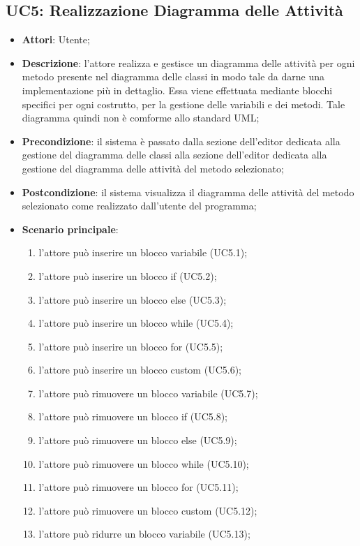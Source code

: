 \subsection{UC5: Realizzazione Diagramma delle Attività}
\label{UC5}
\begin{itemize}
	\item \textbf{Attori}: Utente;
	\item \textbf{Descrizione}: l'attore realizza e gestisce un diagramma delle attività per ogni metodo presente nel diagramma delle classi in modo tale da darne una implementazione più in dettaglio. Essa viene effettuata mediante blocchi specifici per ogni costrutto, per la gestione delle variabili e dei metodi. Tale diagramma quindi non è comforme allo standard UML;
	\item \textbf{Precondizione}: il sistema è passato dalla sezione dell'editor dedicata alla gestione del diagramma delle classi alla sezione dell'editor dedicata alla gestione del diagramma delle attività del metodo selezionato;
	\item \textbf{Postcondizione}: il sistema visualizza il diagramma delle attività del metodo selezionato come realizzato dall'utente del programma;
	\item \textbf{Scenario principale}:
	\begin{enumerate}
		\item l'attore può inserire un blocco variabile (UC5.1);
		\item l'attore può inserire un blocco if (UC5.2);
		\item l'attore può inserire un blocco else (UC5.3);
		\item l'attore può inserire un blocco while (UC5.4);
		\item l'attore può inserire un blocco for (UC5.5);
		\item l'attore può inserire un blocco custom (UC5.6);
		\item l'attore può rimuovere un blocco variabile (UC5.7);
		\item l'attore può rimuovere un blocco if (UC5.8);
		\item l'attore può rimuovere un blocco else (UC5.9);
		\item l'attore può rimuovere un blocco while (UC5.10);
		\item l'attore può rimuovere un blocco for (UC5.11);
		\item l'attore può rimuovere un blocco custom (UC5.12);
		\item l'attore può ridurre un blocco variabile (UC5.13);

\end{enumerate}
\end{itemize}
